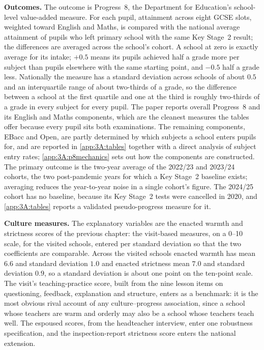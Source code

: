 \textbf{Outcomes.} The outcome is Progress~8, the Department for Education's
school-level value-added measure. For each pupil, attainment across eight GCSE
slots, weighted toward English and Maths, is compared with the national
average attainment of pupils who left primary school with the same Key
Stage~2 result; the differences are averaged across the school's cohort. A
school at zero is exactly average for its intake; $+0.5$ means its pupils
achieved half a grade more per subject than pupils elsewhere with the same
starting point, and $-0.5$ half a grade less. Nationally the measure has a
standard deviation across schools of about $0.5$ and an interquartile range
of about two-thirds of a grade, so the difference between a school at the
first quartile and one at the third is roughly two-thirds of a grade in every
subject for every pupil. The paper reports overall Progress~8 and its English
and Maths components, which are the cleanest measures the tables offer
because every pupil sits both examinations. The remaining components, EBacc
and Open, are partly determined by which subjects a school enters pupils for,
and are reported in \cref{app:3A:tables} together with a direct analysis of
subject entry rates; \cref{app:3A:p8mechanics} sets out how the components are
constructed. The primary outcome is the two-year average of the 2022/23 and
2023/24 cohorts, the two post-pandemic years for which a Key Stage~2 baseline
exists; averaging reduces the year-to-year noise in a single cohort's figure.
The 2024/25 cohort has no baseline, because its Key Stage~2 tests were
cancelled in 2020, and \cref{app:3A:tables} reports a validated
pseudo-progress measure for it.

\textbf{Culture measures.} The explanatory variables are the enacted warmth
and strictness scores of the previous chapter: the visit-based measures, on a
0--10 scale, for the \NTierOne{} visited schools, entered per standard
deviation so that the two coefficients are comparable. Across the visited
schools enacted warmth has mean $6.6$ and standard deviation $1.0$ and enacted
strictness mean $7.0$ and standard deviation $0.9$, so a standard deviation is
about one point on the ten-point scale. The visit's teaching-practice score,
built from the nine lesson items on questioning, feedback, explanation and
structure, enters as a benchmark: it is the most obvious rival account of any
culture--progress association, since a school whose teachers are warm and
orderly may also be a school whose teachers teach well. The espoused scores,
from the headteacher interview, enter one robustness specification, and the
inspection-report strictness score enters the national extension.

